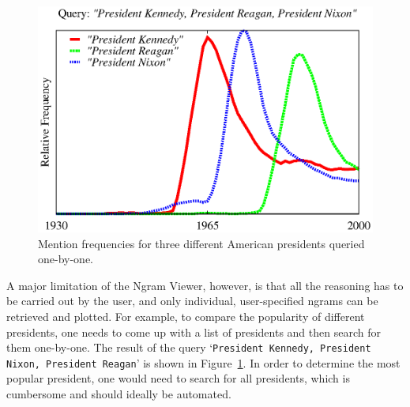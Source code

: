 \documentclass[11pt]{article}
\newcommand{\query}[1]{\texttt{#1}}
\begin{document}
\begin{figure}
\includegraphics[width=\columnwidth]{graphs/kenreanixon}
\caption{\label{fig:manual}Mention frequencies for three different American presidents queried one-by-one.}
\end{figure}

A major limitation of the Ngram Viewer, however, is that all the reasoning has to be carried out by the user, and only individual, user-specified ngrams can be retrieved and plotted. For example, to compare the popularity of different presidents, one needs to come up with a list of presidents and then search for them one-by-one. The result of the query `\query{President Kennedy, President Nixon, President Reagan}' is shown in Figure~\ref{fig:manual}. In order to determine the most popular president, one would need to search for all presidents, which is cumbersome and should ideally be automated.
\end{document}
